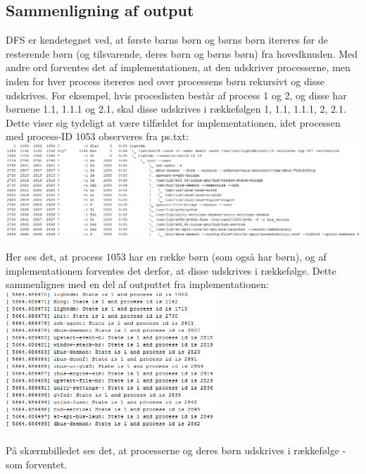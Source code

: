 \subsection{Sammenligning af output}
DFS er kendetegnet ved, at første barns børn og børns børn itereres før de resterende børn (og tilsvarende, deres børn og børns børn) fra hovedknuden. Med andre ord forventes det af implementationen, at den udskriver processerne, men inden for hver process itereres ned over processens børn rekursivt og disse udskrives. For eksempel, hvis proceslisten består af process 1 og 2, og disse har børnene 1.1, 1.1.1 og 2.1, skal disse udskrives i rækkefølgen 1, 1.1, 1.1.1, 2, 2.1.\\

Dette viser sig tydeligt at være tilfældet for implementationen, idet processen med process-ID 1053 observeres fra ps.txt:\\
\includegraphics[width=\textwidth]{Testing/DFS1.png}

Her ses det, at process 1053 har en række børn (som også har børn), og af implementationen forventes det derfor, at disse udskrives i rækkefølge. Dette sammenlignes med en del af outputtet fra implementationen:\\
\includegraphics[width=0.6\textwidth]{Testing/DFS2.png}\\
\\
På skærmbilledet ses det, at processerne og deres børn udskrives i rækkefølge - som forventet.